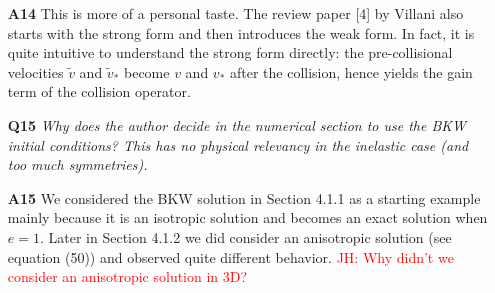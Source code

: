 \documentclass[11pt]{article}
\newcommand{\jh}[1]{\textcolor{red}{JH: #1}}
\begin{document}
\begin{itemize}
\item[{\bf A14}] This is more of a personal taste. The review paper [4] by Villani also starts with the strong form and then introduces the weak form. In fact, it is quite intuitive to understand the strong form directly: the pre-collisional velocities $\tilde{v}$ and $\tilde{v}_*$ become $v$ and $v_*$ after the collision, hence yields the gain term of the collision operator.


\item[{\bf Q15}] {\it Why does the author decide in the numerical section to use the BKW initial conditions? This has no physical relevancy in the inelastic case (and too much symmetries).}

\item[{\bf A15}] We considered the BKW solution in Section 4.1.1 as a starting example mainly because it is an isotropic solution and becomes an exact solution when $e=1$. Later in Section 4.1.2 we did consider an anisotropic solution (see equation (50)) and observed quite different behavior. \jh{Why didn't we consider an anisotropic solution in 3D?}



\end{itemize}
\end{document}
